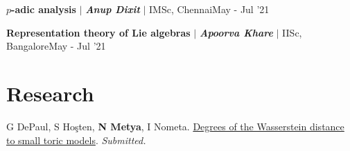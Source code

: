 \resumeProjectHeading
{\textbf{$p$-adic analysis} $|$ \textbf{\emph{Anup Dixit}} $|$ IMSc, Chennai}{May - Jul '21}
\resumeItemListStart
{}
\resumeItemListEnd 
\vspace{\gap}

\resumeProjectHeading
{\textbf{Representation theory of Lie algebras} $|$ \textbf{\emph{Apoorva Khare }}$|$ IISc, Bangalore}{May - Jul '21}
\resumeItemListStart
{}
\resumeItemListEnd 
\resumeSubHeadingListEnd


\section{Research}





\begin{etaremune}[leftmargin=13pt]
\item {\color{grey}G DePaul, S Ho\c{s}ten, \textbf{N Metya}, I Nometa}. \href{https://arxiv.org/abs/2402.09626}{Degrees of the Wasserstein distance to small toric models}. \textit{Submitted.}
\end{etaremune}



